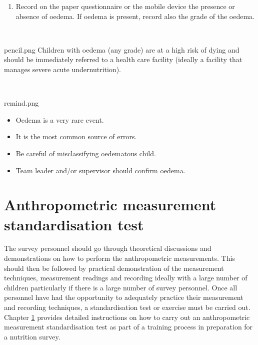 \documentclass[
  12pt,
]{book}
\providecommand{\tightlist}{%
  \setlength{\itemsep}{0pt}\setlength{\parskip}{0pt}}
\newenvironment{rmdremind}
  {\begin{tcolorbox}[width=\textwidth, 
                     colback = {white}, 
                     title = {\textbf{Remember}}, 
                     colbacktitle = lightgray,
                     coltitle = black]
  \begin{includegraphics}[scale = 1]{remind.png}
  \begin{itemize}}
  {\end{itemize}
  \end{includegraphics}
  \end{tcolorbox}}
\newenvironment{rmdnote}
  {\begin{tcolorbox}[width=\textwidth, 
                     colback = {white}, 
                     title = {\textbf{Note}}, 
                     colbacktitle = lightgray,
                     coltitle = black]
  \begin{includegraphics}[scale = 1]{pencil.png}}
  {\end{includegraphics}
  \end{tcolorbox}}
\begin{document}
\begin{enumerate}
\def\labelenumi{\arabic{enumi}.}
\setcounter{enumi}{4}
\tightlist
\item
  Record on the paper questionnaire or the mobile device the presence or absence of oedema. If oedema is present, record also the grade of the oedema.
\end{enumerate}

~

\begin{rmdnote}
Children with oedema (any grade) are at a high risk of dying and should be immediately referred to a health care facility (ideally a facility that manages severe acute undernutrition).
\end{rmdnote}

~

\begin{rmdremind}
\item

Oedema is a very rare event.

\item

It is the most common source of errors.

\item

Be careful of misclassifying oedematous child.

\item

Team leader and/or supervisor should confirm oedema.
\end{rmdremind}

\hypertarget{standard}{%
\chapter{Anthropometric measurement standardisation test}\label{standard}}

The survey personnel should go through theoretical discussions and demonstrations on how to perform the anthropometric measurements. This should then be followed by practical demonstration of the measurement techniques, measurement readings and recording ideally with a large number of children particularly if there is a large number of survey personnel. Once all personnel have had the opportunity to adequately practice their measurement and recording techniques, a standardisation test or exercise must be carried out. Chapter \ref{standard} provides detailed instructions on how to carry out an anthropometric measurement standardisation test as part of a training process in preparation for a nutrition survey.
\end{document}
